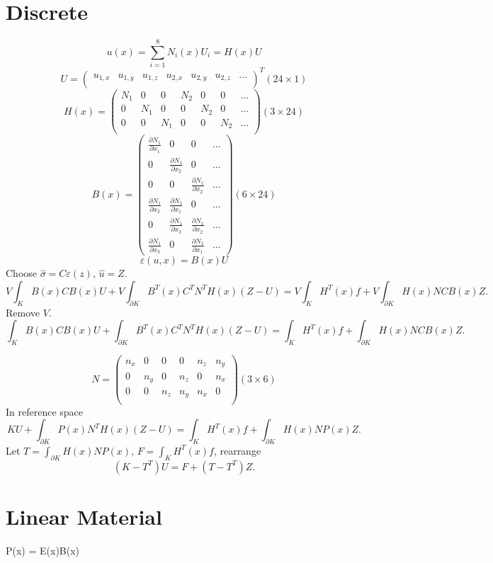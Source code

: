 \documentclass{article}
\begin{document}
\section{Discrete}
	\[u(x)=\sum_{i=1}^{8}N_i(x)U_i = H(x)U\]
	\[U = \begin{pmatrix}
	u_{1,x} & u_{1,y} & u_{1,z} & u_{2,x} & u_{2,y} & u_{2,z} & ...\\
	\end{pmatrix}^T(24\times 1)\]
	\[H(x) = \begin{pmatrix}
	  N_1 & 0   & 0   & N_2 & 0   & 0   & ...\\
	  0   & N_1 & 0   & 0   & N_2 & 0   & ...\\
	  0   & 0   & N_1 & 0   & 0   & N_2 & ...\\	  	  
	\end{pmatrix}(3\times 24)\]
	\[B(x) = \begin{pmatrix}
	  \frac{\partial N_1}{\partial x_1} & 0 & 0& ...\\
	  0 & \frac{\partial N_1}{\partial x_2} & 0& ...\\
	  0 & 0 & \frac{\partial N_1}{\partial x_2}& ...\\
 	  \frac{\partial N_1}{\partial x_2} & \frac{\partial N_1}{\partial x_1} & 0& ...\\
  	  0 & \frac{\partial N_1}{\partial x_3} & \frac{\partial N_1}{\partial x_2}& ...\\
  	  \frac{\partial N_1}{\partial x_3} & 0 & \frac{\partial N_1}{\partial x_1}& ...
	\end{pmatrix}(6\times 24)\]
	\[\varepsilon(u,x) = B(x)U\]
	Choose $\hat{\sigma}=C\varepsilon(z)$, $\hat{u}=Z$.
	\[V\int_K B(x)CB(x)U + V\int_{\partial K}B^T(x)C^TN^TH(x)(Z-U)
	=V\int_K H^T(x)f+V\int_{\partial K}H(x)NCB(x)Z.\]
	Remove $V$.
	\[\int_K B(x)CB(x)U + \int_{\partial K}B^T(x)C^TN^TH(x)(Z-U)
	=\int_K H^T(x)f + \int_{\partial K}H(x)NCB(x)Z.\]
	
	\[
	N = \begin{pmatrix}
	n_x & 0   & 0   & 0   & n_z & n_y\\
	0   & n_y & 0   & n_z & 0   & n_x\\
	0   & 0   & n_z & n_y & n_x & 0  \\		
	\end{pmatrix}(3\times 6)
	\]
	In reference space
	\[KU + \int_{\partial K}P(x)N^TH(x)(Z-U)
	=\int_K H^T(x)f + \int_{\partial K}H(x)NP(x)Z.\]
	Let $T=\int_{\partial K}H(x)NP(x)$, $F = \int_K H^T(x)f$, rearrange
	\[(K-T^T)U=F + (T-T^T)Z.\]
	
\section{Linear Material}
	P(x) = E(x)B(x)
\end{document}
